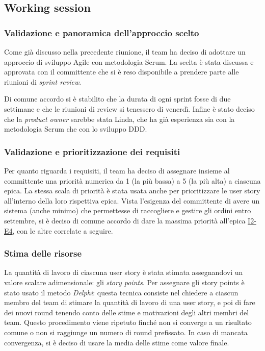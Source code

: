 \subsection{Working session}

\subsubsection{Validazione e panoramica dell'approccio scelto}
Come già discusso nella precedente riunione, il team ha deciso di adottare un approccio di sviluppo Agile con metodologia Scrum. La scelta è stata discussa e approvata con il committente che si è reso disponibile a prendere parte alle riunioni di \emph{sprint review}.

Di comune accordo si è stabilito che la durata di ogni sprint fosse di due settimane e che le riunioni di review si tenessero di venerdì. Infine è stato deciso che la \emph{product owner} sarebbe stata Linda, che ha già esperienza sia con la metodologia Scrum che con lo sviluppo DDD.

\subsubsection{Validazione e prioritizzazione dei requisiti}
Per quanto riguarda i requisiti, il team ha deciso di assegnare insieme al committente una priorità numerica da 1 (la più bassa) a 5 (la più alta) a ciascuna epica.
La stessa scala di priorità è stata usata anche per prioritizzare le user story all'interno della loro rispettiva epica.
Vista l'esigenza del committente di avere un sistema (anche minimo) che permettesse di raccogliere e gestire gli ordini entro settembre, si è deciso di comune accordo di dare la massima priorità all'epica \hyperref[user-story:i2-e4]{I2-E4}, con le altre correlate a seguire.

\subsubsection{Stima delle risorse}
La quantità di lavoro di ciascuna user story è stata stimata assegnandovi un valore scalare adimensionale: gli \emph{story points}.
Per assegnare gli story points è stato usato il metodo \emph{Delphi}: questa tecnica consiste nel chiedere a ciascun membro del team di stimare la quantità di lavoro di una user story, e poi di fare dei nuovi round tenendo conto delle stime e motivazioni degli altri membri del team. Questo procedimento viene ripetuto finché non si converge a un risultato comune o non si raggiunge un numero di round prefissato.
In caso di mancata convergenza, si è deciso di usare la media delle stime come valore finale.

